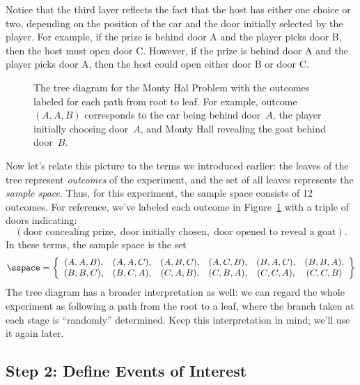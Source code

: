 Notice that the third layer reflects the fact that the host has either one
choice or two, depending on the position of the car and the door initially
selected by the player.  For example, if the prize is behind door A and
the player picks door B, then the host must open door C.  However, if the
prize is behind door A and the player picks door A, then the host could
open either door B or door C.

\begin{figure}


\caption{The tree diagram for the Monty Hal Problem with the outcomes
  labeled for each path from root to leaf.  For example, outcome $(A,
  A, B)$ corresponds to the car being behind door~$A$, the player
  initially choosing door~$A$, and Monty Hall revealing the goat
  behind door~$B$.}

\label{fig:14A3}

\end{figure}

Now let's relate this picture to the terms we introduced earlier: the
leaves of the tree represent \emph{outcomes} of the experiment, and
the set of all leaves represents the \emph{sample space}.  Thus, for
this experiment, the sample space consists of 12 outcomes.  For
reference, we've labeled each outcome in Figure~\ref{fig:14A3} with a
triple of doors indicating:
%
\[
    (\text{door concealing prize}, \;
    \text{door initially chosen}, \;
     \text{door opened to reveal a goat}).
\]
%
In these terms, the sample space is the set
%
\[
\sspace = \left\{
\begin{array}{cccccc}
(A, A, B), & (A, A, C), & (A, B, C), & (A, C, B), & (B, A, C), & (B, B, A), \\
(B, B, C), & (B, C, A), & (C, A, B), & (C, B, A), & (C, C, A), & (C, C, B)
\end{array}
\right\}
\]
%
The tree diagram has a broader interpretation as well: we can regard the
whole experiment as following a path from the root to a leaf, where the
branch taken at each stage is ``randomly'' determined.  Keep this
interpretation in mind; we'll use it again later.

\subsection{Step 2: Define Events of Interest}


